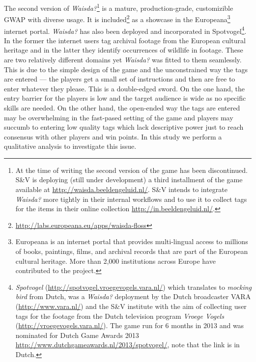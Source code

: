 The second version of \textit{Waisda?}\footnote{At the time of writing the second version of the game has been discontinued. S\&V is deploying (still under development) a third installment of the game available at \url{http://waisda.beeldengeluid.nl/}. S\&V intends to integrate \textit{Waisda?} more tightly in their internal workflows and to use it to collect tags for the items in their online collection \url{http://in.beeldengeluid.nl/}.} is a mature, production-grade, customizible GWAP with diverse usage. 
It is included\footnote{\url{http://labs.europeana.eu/apps/waisda-floss}} as a showcase in the Europeana\footnote{Europeana is an internet portal that provides multi-lingual access to millions of books, paintings, films, and archival records that are part of the European cultural heritage. More than 2,000 institutions across Europe have contributed to the project.} internet portal. \textit{Waisda?} has also been deployed and incorporated in Spotvogel\footnote{\textit{Spotvogel} (\url{http://spotvogel.vroegevogels.vara.nl/}) which translates to \textit{mocking bird} from Dutch, was a \textit{Waisda?} deployment by the Dutch broadcaster VARA (\url{http://www.vara.nl/}) and the S\&V institute with the aim of collecting user tags for the footage from the Dutch television program \textit{Vroege Vogels} (\url{http://vroegevogels.vara.nl/}). The game run for 6 months in 2013 and was nominated for Dutch Game Awards 2013 \url{http://www.dutchgameawards.nl/2013/spotvogel/}, note that the link is in Dutch.}. In the former the internet users tag archival footage from the European cultural heritage and in the latter they identify occurrences of wildlife in footage. These are two relatively different domains yet \textit{Waisda?} was fitted to them seamlessly. This is due to the simple design of the game and the unconstrained way the tags are entered --- the players get a small set of instructions and then are free to enter whatever they please. This is a double-edged sword. On the one hand, the entry barrier for the players is low and the target audience is wide as no specific skills are needed. On the other hand, the open-ended way the tags are entered may be overwhelming in the fast-pased setting of the game and players may succumb to entering low quality tags which lack descriptive power just to reach consensus with other players and win points. In this study we perform a qualitative analysis to investigate this issue.

